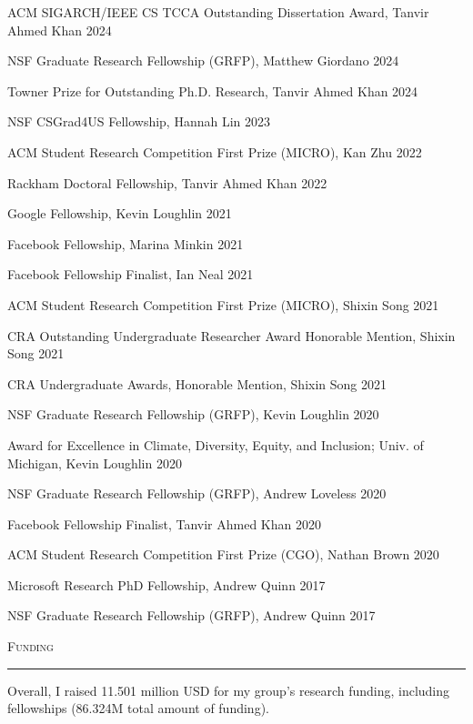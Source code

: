\documentclass[10pt]{article}
\newcommand{\mysec}[1]{%
  \par\addvspace{2em}%
  \Needspace{8\baselineskip}%
  \noindent\textsc{\large #1}\par\vspace{1mm}\hrule\vspace{2mm}%
}
\newcommand{\myssub}[1]{%
  \par\begingroup
    \leftskip=2mm\relax
    \noindent #1\par
  \endgroup
  \vspace{1mm}%
}
\newenvironment{keepblock}{\par\Needspace{4\baselineskip}\noindent}{\par}
\begin{document}
\begin{keepblock}
\myssub{ACM SIGARCH/IEEE CS TCCA Outstanding Dissertation Award, Tanvir Ahmed Khan \hfill 2024}
\myssub{NSF Graduate Research Fellowship (GRFP), Matthew Giordano \hfill 2024}
\myssub{Towner Prize for Outstanding Ph.D. Research, Tanvir Ahmed Khan \hfill 2024}
\myssub{NSF CSGrad4US Fellowship, Hannah Lin \hfill 2023}
\myssub{ACM Student Research Competition First Prize (MICRO), Kan Zhu \hfill 2022}
\myssub{Rackham Doctoral Fellowship, Tanvir Ahmed Khan \hfill 2022}
\myssub{Google Fellowship, Kevin Loughlin \hfill 2021}
\myssub{Facebook Fellowship, Marina Minkin \hfill 2021}
\myssub{Facebook Fellowship Finalist, Ian Neal \hfill 2021}
\myssub{ACM Student Research Competition First Prize (MICRO), Shixin Song \hfill 2021}
\myssub{CRA Outstanding Undergraduate Researcher Award Honorable Mention, Shixin Song \hfill 2021}
\myssub{CRA Undergraduate Awards, Honorable Mention, Shixin Song \hfill 2021}
\myssub{NSF Graduate Research Fellowship (GRFP), Kevin Loughlin \hfill 2020}
\myssub{Award for Excellence in Climate, Diversity, Equity, and Inclusion; Univ. of Michigan, Kevin Loughlin \hfill 2020}
\myssub{NSF Graduate Research Fellowship (GRFP), Andrew Loveless \hfill 2020}
\myssub{Facebook Fellowship Finalist, Tanvir Ahmed Khan \hfill 2020}
\myssub{ACM Student Research Competition First Prize (CGO), Nathan Brown \hfill 2020}
\end{keepblock}
\myssub{Microsoft Research PhD Fellowship, Andrew Quinn \hfill 2017}
\myssub{NSF Graduate Research Fellowship (GRFP), Andrew Quinn \hfill 2017}





\mysec{Funding}

Overall, I raised 11.501 million USD for my group's research funding, including fellowships (86.324M total amount of funding).\\
\end{document}
